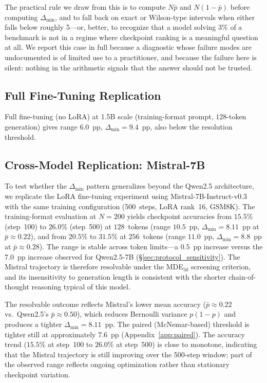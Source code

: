 \documentclass[pdflatex,sn-mathphys-ay,iicol]{sn-jnl}
\theoremstyle{thmstylethree}
\begin{document}
\begin{table}[t]
The practical rule we draw from this is to compute $N\bar p$ and $N(1-\bar p)$ before computing $\Delta_{\min}$, and to fall back on exact or Wilson-type intervals when either falls below roughly 5---or, better, to recognize that a model solving $3\%$ of a benchmark is not in a regime where checkpoint ranking is a meaningful question at all. We report this case in full because a diagnostic whose failure modes are undocumented is of limited use to a practitioner, and because the failure here is silent: nothing in the arithmetic signals that the answer should not be trusted.

\subsection{Full Fine-Tuning Replication}\label{sec:full_ft}

Full fine-tuning (no LoRA) at 1.5B scale (training-format prompt, $128$-token generation) gives range $6.0$~pp, $\Delta_{\min}=9.4$~pp, also below the resolution threshold.

\subsection{Cross-Model Replication: Mistral-7B}\label{sec:mistral}

To test whether the $\Delta_{\min}$ pattern generalizes beyond the Qwen2.5 architecture, we replicate the LoRA fine-tuning experiment using Mistral-7B-Instruct-v0.3~\citep{jiang2023mistral} with the same training configuration (500~steps, LoRA rank~16, GSM8K). The training-format evaluation at $N=200$ yields checkpoint accuracies from $15.5\%$ (step~100) to $26.0\%$ (step~500) at $128$~tokens (range $10.5$~pp, $\Delta_{\min}=8.11$~pp at $\bar{p}\approx0.22$), and from $20.5\%$ to $31.5\%$ at $256$~tokens (range $11.0$~pp, $\Delta_{\min}=8.8$~pp at $\bar{p}\approx0.28$). The range is stable across token limits---a $0.5$~pp increase versus the $7.0$~pp increase observed for Qwen2.5-7B (\S\ref{sec:protocol_sensitivity}). The Mistral trajectory is therefore resolvable under the MDE$_{50}$ screening criterion, and its insensitivity to generation length is consistent with the shorter chain-of-thought reasoning typical of this model.

The resolvable outcome reflects Mistral's lower mean accuracy ($\bar{p}\approx0.22$ vs.\ Qwen2.5's $\bar{p}\approx0.50$), which reduces Bernoulli variance $p(1-p)$ and produces a tighter $\Delta_{\min}=8.11$~pp. The paired (McNemar-based) threshold is tighter still at approximately $7.6$~pp (Appendix~\ref{app:paired}). The accuracy trend ($15.5\%$ at step~100 to $26.0\%$ at step~500) is close to monotone, indicating that the Mistral trajectory is still improving over the 500-step window; part of the observed range reflects ongoing optimization rather than stationary checkpoint variation.


\end{table}
\end{document}
